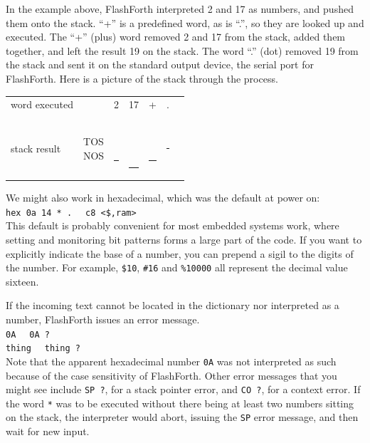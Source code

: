 \documentclass[12pt,a4paper]{article}
\begin{document}
\medskip
In the example above, FlashForth interpreted 2 and 17 as numbers, and pushed them onto the stack.
``+'' is a predefined word, as is ``.'', so they are looked up and executed.
The ``+'' (plus) word removed 2 and 17 from the stack, added them together, 
and left the result 19 on the stack. 
The word ``.'' (dot) removed 19 from the stack and sent it on the standard output device,
the serial port for FlashForth.
Here is a picture of the stack through the process.
\begin{center}
 \begin{tabular}{lc|ccccc}
 word executed & & 2 & 17 & + & . \\
 \\
 stack result  
 & \parbox[t]{35pt}{TOS \\ NOS} 
 & \parbox[t]{25pt}{ \\ \rule{20pt}{2pt}} 
 & \parbox[t]{25pt}{ \\  \\ \rule{20pt}{2pt}}
 & \parbox[t]{25pt}{ \\ \rule{20pt}{2pt}}
 & \parbox[t]{25pt}{\rule{20pt}{2pt}} \\
 \end{tabular}
\end{center}


\medskip
We might also work in hexadecimal, which was the default at power on: \vspace{7pt} \\
\verb!hex 0a 14 * . ! \fbox{$\hookleftarrow$} \verb! c8 <$,ram>! \vspace{7pt} \\
This default is probably convenient for most embedded systems work,
where setting and monitoring bit patterns forms a large part of the code.
If you want to explicitly indicate the base of a number, you can prepend a sigil to the
digits of the number.
For example, \verb!$10!, \verb!#16! and \verb!%10000! all represent the decimal value sixteen.

\medskip
If the incoming text cannot be located in the dictionary nor interpreted as a number,
FlashForth issues an error message. \vspace{7pt} \\
\verb!0A ! \fbox{$\hookleftarrow$} \verb! 0A ?! \vspace{7pt} \\
\verb!thing ! \fbox{$\hookleftarrow$} \verb! thing ?! \vspace{7pt} \\
Note that the apparent hexadecimal number \verb!0A! was not interpreted as such 
because of the case sensitivity of FlashForth.
Other error messages that you might see include \verb!SP ?!, for a stack pointer error, 
and \verb!CO ?!, for a context error.
If the word \verb!*! was to be executed without there being at least two numbers sitting 
on the stack, the interpreter would abort, issuing the \verb!SP! error message, 
and then wait for new input.
\end{document}
